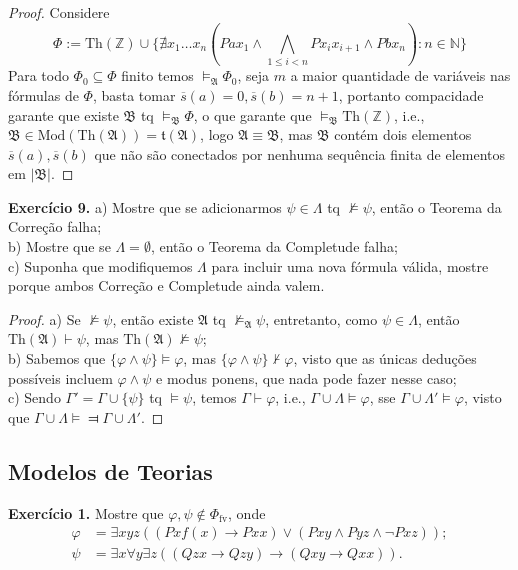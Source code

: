 \documentclass[11pt]{article}
\newcommand{\mf}[1]{\mathfrak{#1}}
\newcommand{\mbb}[1]{\mathbb{#1}}
\newcommand{\subs}[2]{
    \setcounter{subsection}{#1 - 1}
    \subsection{#2}
    }
\begin{document}
\begin{proof}
    Considere
    $$\Phi:=\text{Th}(\mbb{Z})\cup\Biggl\{\nexists x_1\dots x_n\left(Pax_1\wedge\bigwedge_{1\leq i<n}Px_ix_{i+1}\wedge Pbx_n\right): n\in\mbb{N}\Biggr\}$$
    Para todo $\Phi_0\subseteq\Phi$ finito temos $\vDash_\mf{A}\Phi_0$, seja $m$ a maior quantidade de variáveis nas fórmulas de $\Phi$, basta tomar $\overline{s}(a)=0,\overline{s}(b)=n+1$, portanto compacidade garante que existe $\mf{B}$ tq $\vDash_\mf{B}\Phi$, o que garante que $\vDash_\mf{B}\text{Th}(\mbb{Z})$, i.e., $\mf{B}\in\text{Mod}(\text{Th}(\mf{A}))=\mf{t}(\mf{A})$, logo $\mf{A}\equiv\mf{B}$, mas $\mf{B}$ contém dois elementos $\overline{s}(a),\overline{s}(b)$ que não são conectados por nenhuma sequência finita de elementos em $|\mf{B}|$.
\end{proof}

\begin{shaded}
\textbf{Exercício 9.} a) Mostre que se adicionarmos $\psi\in\Lambda$ tq $\nvDash\psi$, então o Teorema da Correção falha;\\
b) Mostre que se $\Lambda=\emptyset$, então o Teorema da Completude falha;\\
c) Suponha que modifiquemos $\Lambda$ para incluir uma nova fórmula válida, mostre porque ambos Correção e Completude ainda valem.
\end{shaded}

\begin{proof}
    a) Se $\nvDash\psi$, então existe $\mf{A}$ tq $\nvDash_\mf{A}\psi$, entretanto, como $\psi\in\Lambda$, então $\text{Th}(\mf{A})\vdash\psi$, mas $\text{Th}(\mf{A})\nvDash\psi$;\\
    b) Sabemos que $\{\varphi\wedge\psi\}\vDash\varphi$, mas $\{\varphi\wedge\psi\}\nvdash\varphi$, visto que as únicas deduções possíveis incluem $\varphi\wedge\psi$ e modus ponens, que nada pode fazer nesse caso;\\
    c) Sendo $\Gamma'=\Gamma\cup\{\psi\}$ tq $\vDash\psi$, temos $\Gamma\vdash\varphi$, i.e., $\Gamma\cup\Lambda\vDash\varphi$, sse $\Gamma\cup\Lambda'\vDash\varphi$, visto que $\Gamma\cup\Lambda\vDash\Dashv\Gamma\cup\Lambda'$.
\end{proof}

\subs{6}{Modelos de Teorias}

\begin{shaded}
\textbf{Exercício 1.} Mostre que $\varphi,\psi\notin\Phi_\text{fv}$, onde
\begin{align*}
    \varphi & = \exists xyz((Pxf(x)\to Pxx)\vee(Pxy\wedge Pyz\wedge\neg Pxz));\\
    \psi & = \exists x\forall y\exists z((Qzx\to Qzy)\to(Qxy\to Qxx)).
\end{align*}
\end{shaded}
\end{document}
